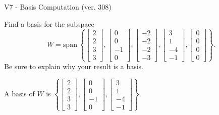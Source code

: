 \begin{exercise}
  \begin{exerciseTitle}V7 - Basis Computation (ver. 308)\end{exerciseTitle}
  \begin{exerciseStatement}
    Find a basis for the subspace 
\[W=\mathrm{span}\ \left\{\left[\begin{array}{r}
2 \\
2 \\
3 \\
3
\end{array}\right] , \left[\begin{array}{r}
0 \\
0 \\
-1 \\
0
\end{array}\right] , \left[\begin{array}{r}
-2 \\
-2 \\
-2 \\
-3
\end{array}\right] , \left[\begin{array}{r}
3 \\
1 \\
-4 \\
-1
\end{array}\right] , \left[\begin{array}{r}
0 \\
0 \\
0 \\
0
\end{array}\right]\right\}.\]
 Be sure to explain why your result is a basis.


  \end{exerciseStatement}
  \begin{exerciseAnswer}
   A basis of \(W\) is  \(\left\{\left[\begin{array}{r}
2 \\
2 \\
3 \\
3
\end{array}\right] , \left[\begin{array}{r}
0 \\
0 \\
-1 \\
0
\end{array}\right] , \left[\begin{array}{r}
3 \\
1 \\
-4 \\
-1
\end{array}\right]\right\}\).
  


  \end{exerciseAnswer}
\end{exercise}
